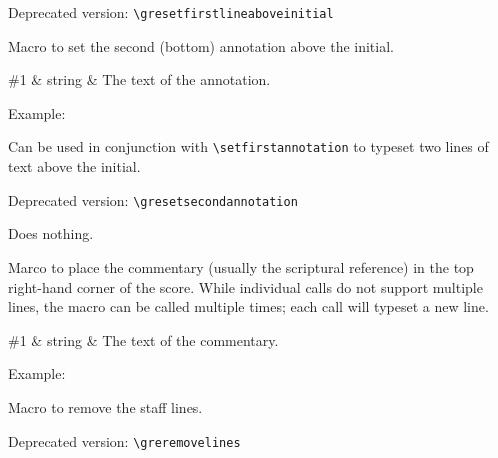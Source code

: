 \smallskip\hspace{15pt} Deprecated version: \verb=\gresetfirstlineaboveinitial=

Macro to set the second (bottom) annotation above the initial.

\begin{argtable}
  \#1 & string & The text of the annotation.\\
\end{argtable}

Example:\par\medskip
\begin{latexcode}
\end{latexcode}

Can be used in conjunction with \verb=\setfirstannotation= to typeset
two lines of text above the initial.

\medskip
\begin{latexcode}
\end{latexcode}

\smallskip\hspace{15pt} Deprecated version: \verb=\gresetsecondannotation=

Does nothing.

Marco to place the commentary (usually the scriptural reference) in
the top right-hand corner of the score.  While individual calls do not
support multiple lines, the macro can be called multiple times; each
call will typeset a new line.

\begin{argtable}
  \#1 & string & The text of the commentary.\\
\end{argtable}

Example:\par\medskip
\begin{latexcode}
\end{latexcode}

Macro to remove the staff lines.

\smallskip\hspace{15pt} Deprecated version: \verb=\greremovelines=

